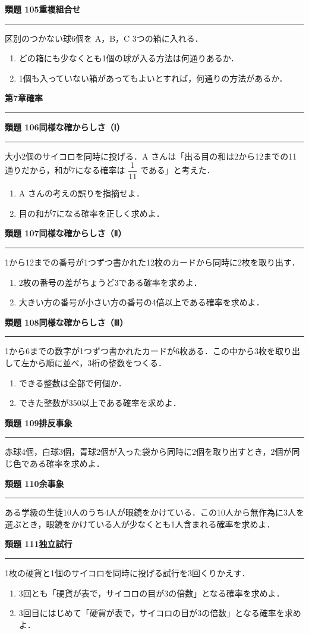 \documentclass[a4paper,11pt]{ltjsarticle}
\newcommand{\mon}[2]{\Needspace{7\baselineskip}\vspace{10pt}%
  {\sffamily\bfseries 類題 #1\quad #2\par}\vspace{2pt}\hrule\vspace{4pt}}
\newcommand{\shou}[2]{\clearpage\markboth{#1\quad #2}{}%
  {\sffamily\bfseries\LARGE #1\quad #2\par}\vspace{2pt}\hrule height 1.2pt\vspace{4pt}}
\begin{document}
\mon{105}{重複組合せ}
区別のつかない球6個を A，B，C 3つの箱に入れる．
\begin{enumerate}
\item どの箱にも少なくとも1個の球が入る方法は何通りあるか．
\item 1個も入っていない箱があってもよいとすれば，何通りの方法があるか．
\end{enumerate}

\shou{第7章}{確率}
\mon{106}{同様な確からしさ（Ⅰ）}
大小2個のサイコロを同時に投げる．A さんは「出る目の和は2から12までの11通りだから，和が7になる確率は $\dfrac{1}{11}$ である」と考えた．
\begin{enumerate}
\item A さんの考えの誤りを指摘せよ．
\item 目の和が7になる確率を正しく求めよ．
\end{enumerate}

\mon{107}{同様な確からしさ（Ⅱ）}
1から12までの番号が1つずつ書かれた12枚のカードから同時に2枚を取り出す．
\begin{enumerate}
\item 2枚の番号の差がちょうど3である確率を求めよ．
\item 大きい方の番号が小さい方の番号の4倍以上である確率を求めよ．
\end{enumerate}

\mon{108}{同様な確からしさ（Ⅲ）}
1から6までの数字が1つずつ書かれたカードが6枚ある．この中から3枚を取り出して左から順に並べ，3桁の整数をつくる．
\begin{enumerate}
\item できる整数は全部で何個か．
\item できた整数が350以上である確率を求めよ．
\end{enumerate}

\mon{109}{排反事象}
赤球4個，白球3個，青球2個が入った袋から同時に2個を取り出すとき，2個が同じ色である確率を求めよ．

\mon{110}{余事象}
ある学級の生徒10人のうち4人が眼鏡をかけている．この10人から無作為に3人を選ぶとき，眼鏡をかけている人が少なくとも1人含まれる確率を求めよ．

\mon{111}{独立試行}
1枚の硬貨と1個のサイコロを同時に投げる試行を3回くりかえす．
\begin{enumerate}
\item 3回とも「硬貨が表で，サイコロの目が3の倍数」となる確率を求めよ．
\item 3回目にはじめて「硬貨が表で，サイコロの目が3の倍数」となる確率を求めよ．
\end{enumerate}
\end{document}
